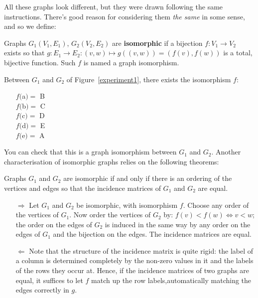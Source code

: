 All these graphs look different, but they were drawn following the
same instructions. There's good reason for considering them {\em
the same} in some sense, and so we define:

\begin{definition}\label{isomorfegraphs}
	\textup{Graphs $G_1(V_1,E_1)$, $G_2(V_2,E_2)$ are
	\textbf{isomorphic} if a bijection $f: V_{1}
	\rightarrow V_{2}$ exists so that $g: E_{1} \rightarrow E_{2} : (v,w) \mapsto g((v,w)) = (f(v),f(w))$ is a total, bijective function.  Such $f$ is named a
	graph isomorphism.}
\end{definition}

Between $G_1$ and $G_2$ of Figure~\ref{experiment1}, there exists
the isomorphism $f$:
\begin{itemize}
\item[]
$f($a$) =$ B\\
$f($b$) =$ C\\
$f($c$) =$ D\\
$f($d$) =$ E\\
$f($e$) =$ A
\end{itemize}

You can check that this is a graph isomorphism between $G_{1}$ and
$G_{2}$. Another characterisation of isomorphic graphs relies on the
following theorems:

\begin{theorem}
Graphs $G_{1}$ and $G_{2}$ are isomorphic if and only if there is an
ordering of the vertices and edges so that the incidence matrices of
$G_{1}$ and $G_{2}$ are equal.
\end{theorem}
\begin{proof*}
\begin{itemize}
\item[$\Rightarrow$]
Let $G_{1}$ and $G_{2}$ be isomorphic, with isomorphism $f$.
Choose any order of the vertices of $G_{1}$. Now order the vertices of
$G_{2}$ by: $f(v) < f(w) \Leftrightarrow v < w$; the order on the
edges of $G_{2}$ is induced in the same way by any order on the edges
of $G_{1}$ and the bijection on the edges. The incidence matrices are
equal.
\item[$\Leftarrow$] Note that the structure of the incidence matrix is quite rigid: the label of a column is determined completely by the non-zero values in it and the labels of the rows they occur at. Hence, if the incidence matrices of two graphs are equal, it suffices to let $f$ match up the row labels,automatically matching the edges correctly in $g$.
\end{itemize}
\end{proof*}

